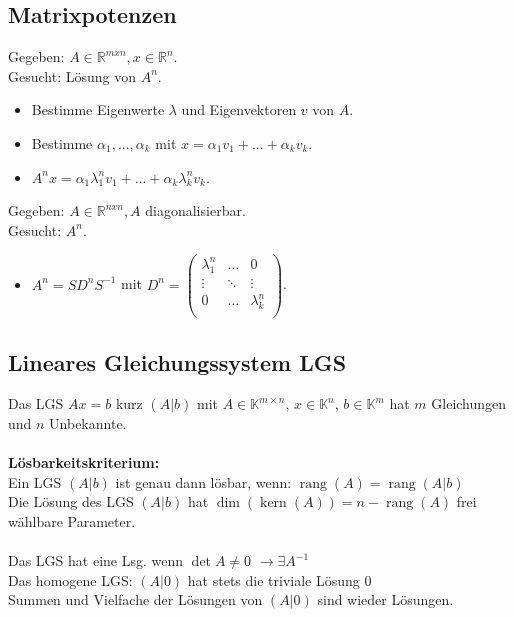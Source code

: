 \documentclass[german, 6pt]{latex4ei/latex4ei_sheet}
\DeclareMathOperator{\rang}{rang}
\DeclareMathOperator{\Kern}{kern}
\begin{document}
\subsection{Matrixpotenzen}
Gegeben: $A \in\mathbb{R}^{mxn}, x \in\mathbb{R}^n$.\\
Gesucht: Lösung von $A^n$.\\
\begin{itemize}
	\item Bestimme Eigenwerte $\lambda$ und Eigenvektoren $v$ von $A$.
	\item Bestimme $\alpha_1, ..., \alpha_k$ mit $x = \alpha_1v_1 + ... + \alpha_kv_k$.
	\item $A^nx = \alpha_1\lambda_1^nv_1+ ... + \alpha_k\lambda_k^nv_k$.
\end{itemize}
Gegeben: $A \in\mathbb{R}^{nxn}, A$ diagonalisierbar.\\
Gesucht: $A^n$.
\begin{itemize}
	\item $A^n = SD^nS^{-1}$ mit $D^n = \begin{pmatrix}
	\lambda_1^n & \ldots & 0 \\
	\vdots & \ddots & \vdots\\
	0 & \ldots & \lambda_k^n \\
	\end{pmatrix}$.
\end{itemize}
\subsection{Lineares Gleichungssystem LGS}
Das LGS $Ax=b$ kurz $(A|b)$ mit $A\in \mathbb K^{m\times n}$, $x\in \mathbb K^n$, $b\in \mathbb K^m$ hat $m$ Gleichungen und $n$ Unbekannte.\\
\\
\textbf{Lösbarkeitskriterium:}\\
Ein LGS $(A|b)$ ist genau dann lösbar, wenn: $\rang(A)=\rang(A|b)$\\
Die Lösung des LGS $(A|b)$ hat $\dim(\Kern(A)) = n-\rang(A)$ frei wählbare Parameter.\\
\\
Das LGS hat eine Lsg. wenn $\det A \not= 0$ \quad $\rightarrow \exists A^{-1}$ \\
Das homogene LGS: $(A|0)$ hat stets die triviale Lösung $0$\\
Summen und Vielfache der Lösungen von $(A|0)$ sind wieder Lösungen.
\end{document}
